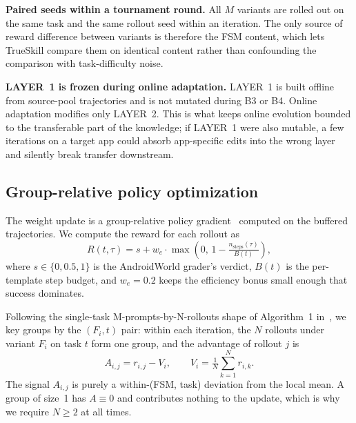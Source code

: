 \textbf{Paired seeds within a tournament round.} All $M$ variants are rolled out on the same task and the same rollout seed within an iteration. The only source of reward difference between variants is therefore the FSM content, which lets TrueSkill compare them on identical content rather than confounding the comparison with task-difficulty noise.

\textbf{LAYER~1 is frozen during online adaptation.} LAYER~1 is built offline from source-pool trajectories and is not mutated during B3 or B4. Online adaptation modifies only LAYER~2. This is what keeps online evolution bounded to the transferable part of the knowledge; if LAYER~1 were also mutable, a few iterations on a target app could absorb app-specific edits into the wrong layer and silently break transfer downstream.

\subsection{Group-relative policy optimization}
\label{sec:method-grpo}

The weight update is a group-relative policy gradient~\citep{shao2024deepseekmath} computed on the buffered trajectories. We compute the reward for each rollout as
\begin{equation}
R(t,\tau) = s + w_e \cdot \max\!\left(0,\, 1 - \tfrac{n_{\text{steps}}(\tau)}{B(t)}\right),
\label{eq:reward}
\end{equation}
where $s \in \{0, 0.5, 1\}$ is the AndroidWorld grader's verdict, $B(t)$ is the per-template step budget, and $w_e = 0.2$ keeps the efficiency bonus small enough that success dominates.

Following the single-task M-prompts-by-N-rollouts shape of Algorithm~1 in~\citet{zhang2026espl}, we key groups by the $(F_i, t)$ pair: within each iteration, the $N$ rollouts under variant $F_i$ on task $t$ form one group, and the advantage of rollout $j$ is
\begin{equation}
A_{i,j} = r_{i,j} - V_i, \qquad V_i = \tfrac{1}{N}\sum_{k=1}^{N} r_{i,k}.
\label{eq:advantage}
\end{equation}
The signal $A_{i,j}$ is purely a within-(FSM, task) deviation from the local mean. A group of size~1 has $A \equiv 0$ and contributes nothing to the update, which is why we require $N \ge 2$ at all times.

